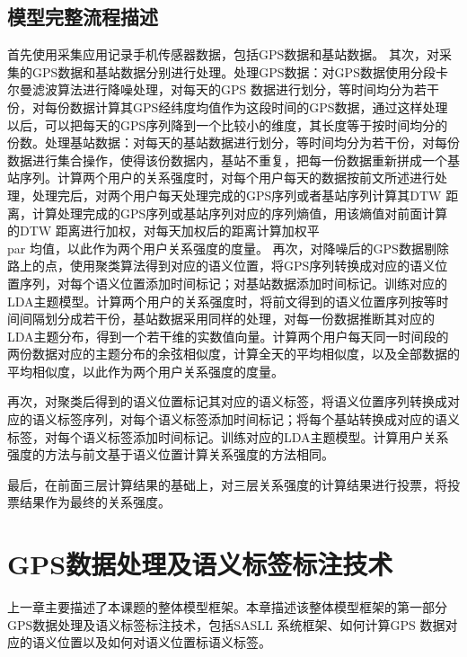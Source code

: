 \section{模型完整流程描述}
\label{sec:section7-2}
首先使用采集应用记录手机传感器数据，包括GPS数据和基站数据。
其次，对采集的GPS数据和基站数据分别进行处理。处理GPS数据：对GPS数据使用分段卡尔曼滤波算法进行降噪处理，对每天的GPS 数据进行划分，等时间均分为若干份，对每份数据计算其GPS经纬度均值作为这段时间的GPS数据，通过这样处理以后，可以把每天的GPS序列降到一个比较小的维度，其长度等于按时间均分的份数。处理基站数据：对每天的基站数据进行划分，等时间均分为若干份，对每份数据进行集合操作，使得该份数据内，基站不重复，把每一份数据重新拼成一个基站序列。计算两个用户的关系强度时，对每个用户每天的数据按前文所述进行处理，处理完后，对两个用户每天处理完成的GPS序列或者基站序列计算其DTW 距离，计算处理完成的GPS序列或基站序列对应的序列熵值，用该熵值对前面计算的DTW 距离进行加权，对每天加权后的距离计算加权平\\par 均值，以此作为两个用户关系强度的度量。
再次，对降噪后的GPS数据剔除路上的点，使用聚类算法得到对应的语义位置，将GPS序列转换成对应的语义位置序列，对每个语义位置添加时间标记；对基站数据添加时间标记。训练对应的LDA主题模型。计算两个用户的关系强度时，将前文得到的语义位置序列按等时间间隔划分成若干份，基站数据采用同样的处理，对每一份数据推断其对应的LDA主题分布，得到一个若干维的实数值向量。计算两个用户每天同一时间段的两份数据对应的主题分布的余弦相似度，计算全天的平均相似度，以及全部数据的平均相似度，以此作为两个用户关系强度的度量。
\par 再次，对聚类后得到的语义位置标记其对应的语义标签，将语义位置序列转换成对应的语义标签序列，对每个语义标签添加时间标记；将每个基站转换成对应的语义标签，对每个语义标签添加时间标记。训练对应的LDA主题模型。计算用户关系强度的方法与前文基于语义位置计算关系强度的方法相同。
\par 最后，在前面三层计算结果的基础上，对三层关系强度的计算结果进行投票，将投票结果作为最终的关系强度。
\chapter{GPS数据处理及语义标签标注技术}
\label{chap:chapter03}
上一章主要描述了本课题的整体模型框架。本章描述该整体模型框架的第一部分GPS数据处理及语义标签标注技术，包括SASLL 系统框架、如何计算GPS 数据对应的语义位置以及如何对语义位置标语义标签。
